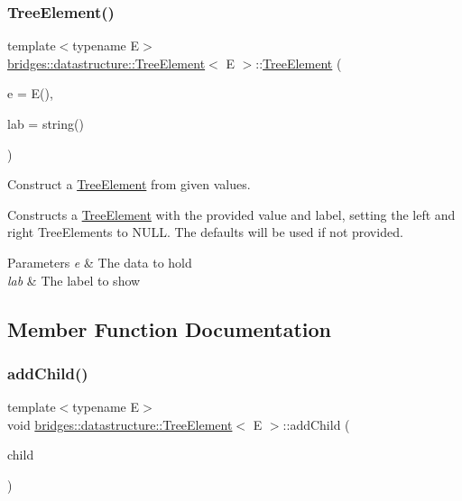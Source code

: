 \subsubsection{\texorpdfstring{Tree\+Element()}{TreeElement()}}
{\footnotesize\ttfamily template$<$typename E$>$ \\
\hyperlink{classbridges_1_1datastructure_1_1_tree_element}{bridges\+::datastructure\+::\+Tree\+Element}$<$ E $>$\+::\hyperlink{classbridges_1_1datastructure_1_1_tree_element}{Tree\+Element} (\begin{DoxyParamCaption}\item[{const E \&}]{e = {\ttfamily E()},  }\item[{const string \&}]{lab = {\ttfamily string()} }\end{DoxyParamCaption})\hspace{0.3cm}{\ttfamily [inline]}}



Construct a \hyperlink{classbridges_1_1datastructure_1_1_tree_element}{Tree\+Element} from given values. 

Constructs a \hyperlink{classbridges_1_1datastructure_1_1_tree_element}{Tree\+Element} with the provided value and label, setting the left and right Tree\+Elements to N\+U\+LL. The defaults will be used if not provided.


\begin{DoxyParams}{Parameters}
{\em e} & The data to hold \\
\hline
{\em lab} & The label to show \\
\hline
\end{DoxyParams}


\subsection{Member Function Documentation}
\mbox{\label{classbridges_1_1datastructure_1_1_tree_element_a4c05db5e970707e1421fe664bc4ef3b7}} 
\subsubsection{\texorpdfstring{add\+Child()}{addChild()}}
{\footnotesize\ttfamily template$<$typename E$>$ \\
void \hyperlink{classbridges_1_1datastructure_1_1_tree_element}{bridges\+::datastructure\+::\+Tree\+Element}$<$ E $>$\+::add\+Child (\begin{DoxyParamCaption}\item[{\hyperlink{classbridges_1_1datastructure_1_1_tree_element}{Tree\+Element}$<$ E $>$ $\ast$}]{child }\end{DoxyParamCaption})\hspace{0.3cm}{\ttfamily [inline]}}



